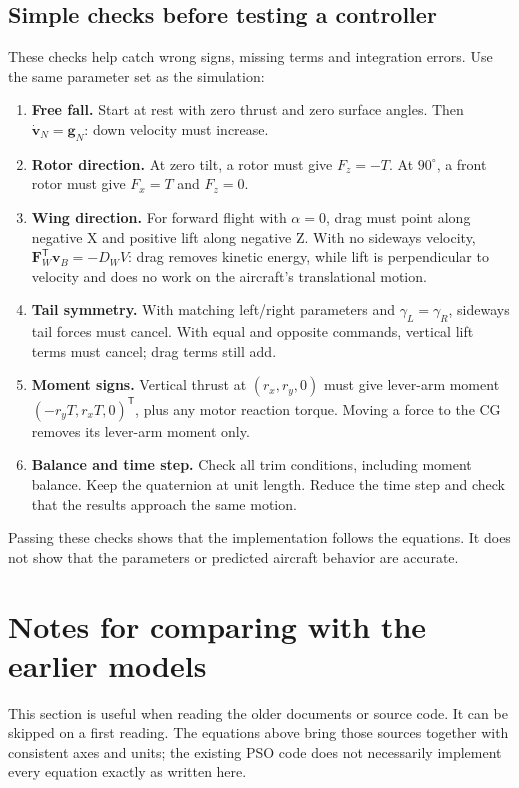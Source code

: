 \documentclass[11pt,a4paper]{article}
\numberwithin{equation}{section}
\newcommand{\vect}[1]{\boldsymbol{#1}}
\newcommand{\trans}{^{\mathsf T}}
\begin{document}
\subsection{Simple checks before testing a controller}
These checks help catch wrong signs, missing terms and integration errors.
Use the same parameter set as the simulation:
\begin{enumerate}
 \item \textbf{Free fall.} Start at rest with zero thrust and zero surface
 angles. Then $\dot{\vect v}_N=\vect g_N$: down velocity must increase.
 \item \textbf{Rotor direction.} At zero tilt, a rotor must give $F_z=-T$.
 At $90^\circ$, a front rotor must give $F_x=T$ and $F_z=0$.
 \item \textbf{Wing direction.} For forward flight with $\alpha=0$, drag
 must point along negative X and positive lift along negative Z.
 With no sideways velocity,
 $\vect F_W\trans\vect v_B=-D_W V$: drag removes kinetic energy, while
 lift is perpendicular to velocity and does no work on the aircraft's
 translational motion.
 \item \textbf{Tail symmetry.} With matching left/right parameters and
 $\gamma_L=\gamma_R$, sideways tail forces must cancel. With equal and
 opposite commands, vertical lift terms must cancel; drag terms still add.
 \item \textbf{Moment signs.} Vertical thrust at $(r_x,r_y,0)$ must give
 lever-arm moment $(-r_yT,r_xT,0)\trans$, plus any motor reaction torque.
 Moving a force to the CG removes its lever-arm moment only.
 \item \textbf{Balance and time step.} Check all trim conditions, including
 moment balance. Keep the quaternion at unit length. Reduce the time step
 and check that the results approach the same motion.
\end{enumerate}
Passing these checks shows that the implementation follows the equations.
It does not show that the parameters or predicted aircraft behavior are
accurate.

\clearpage
\section{Notes for comparing with the earlier models}
This section is useful when reading the older documents or source code.
It can be skipped on a first reading. The equations above bring those sources
together with consistent axes and units; the existing PSO code does not
necessarily implement every equation exactly as written here.
\end{document}
